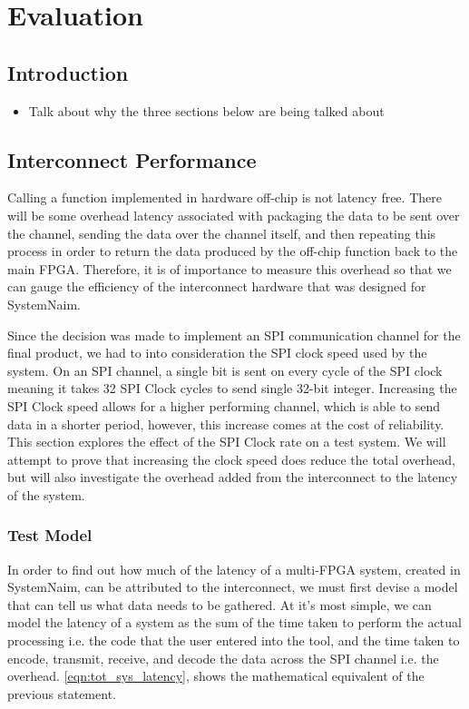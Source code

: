 \chapter{Evaluation}

\section{Introduction}

\begin{itemize}
    \item Talk about why the three sections below are being talked about
\end{itemize}


\section{Interconnect Performance}

Calling a function implemented in hardware off-chip is not latency free. There will be some overhead latency associated with packaging the data to be sent over the channel, sending the data over the channel itself, and then repeating this process in order to return the data produced by the off-chip function back to the main FPGA. Therefore, it is of importance to measure this overhead so that we can gauge the efficiency of the interconnect hardware that was designed for SystemNaim.

Since the decision was made to implement an SPI communication channel for the final product, we had to into consideration the SPI clock speed used by the system. On an SPI channel, a single bit is sent on every cycle of the SPI clock meaning it takes 32 SPI Clock cycles to send single 32-bit integer. Increasing the SPI Clock speed allows for a higher performing channel, which is able to send data in a shorter period, however, this increase comes at the cost of reliability. This section explores the effect of the SPI Clock rate on a test system. We will attempt to prove that increasing the clock speed does reduce the total overhead, but will also investigate the overhead added from the interconnect to the latency of the system.

\subsection{Test Model}

In order to find out how much of the latency of a multi-FPGA system, created in SystemNaim, can be attributed to the interconnect, we must first devise a model that can tell us what data needs to be gathered. At it's most simple, we can model the latency of a system as the sum of the time taken to perform the actual processing i.e. the code that the user entered into the tool, and the time taken to encode, transmit, receive, and decode the data across the SPI channel i.e. the overhead. \autoref{eqn:tot_sys_latency}, shows the mathematical equivalent of the previous statement.

